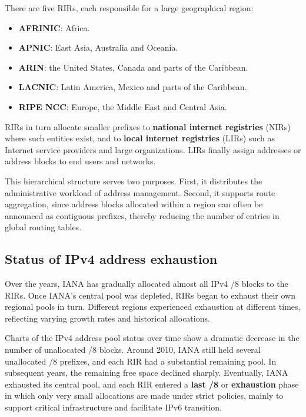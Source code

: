 There are five RIRs, each responsible for a large geographical region:

\begin{itemize}
\item \textbf{AFRINIC}: Africa.
\item \textbf{APNIC}: East Asia, Australia and Oceania.
\item \textbf{ARIN}: the United States, Canada and parts of the Caribbean.
\item \textbf{LACNIC}: Latin America, Mexico and parts of the Caribbean.
\item \textbf{RIPE NCC}: Europe, the Middle East and Central Asia.
\end{itemize}

RIRs in turn allocate smaller prefixes to \textbf{national internet registries} (NIRs) where such entities exist, and to \textbf{local internet registries} (LIRs) such as Internet service providers and large organizations. LIRs finally assign addresses or address blocks to end users and networks.

This hierarchical structure serves two purposes. First, it distributes the administrative workload of address management. Second, it supports route aggregation, since address blocks allocated within a region can often be announced as contiguous prefixes, thereby reducing the number of entries in global routing tables.

\begin{center}
\end{center}

\subsection{Status of IPv4 address exhaustion}

Over the years, IANA has gradually allocated almost all IPv4 /8 blocks to the RIRs. Once IANA's central pool was depleted, RIRs began to exhaust their own regional pools in turn. Different regions experienced exhaustion at different times, reflecting varying growth rates and historical allocations.

Charts of the IPv4 address pool status over time show a dramatic decrease in the number of unallocated /8 blocks. Around 2010, IANA still held several unallocated /8 prefixes, and each RIR had a substantial remaining pool. In subsequent years, the remaining free space declined sharply. Eventually, IANA exhausted its central pool, and each RIR entered a \textbf{last /8} or \textbf{exhaustion} phase in which only very small allocations are made under strict policies, mainly to support critical infrastructure and facilitate IPv6 transition.

